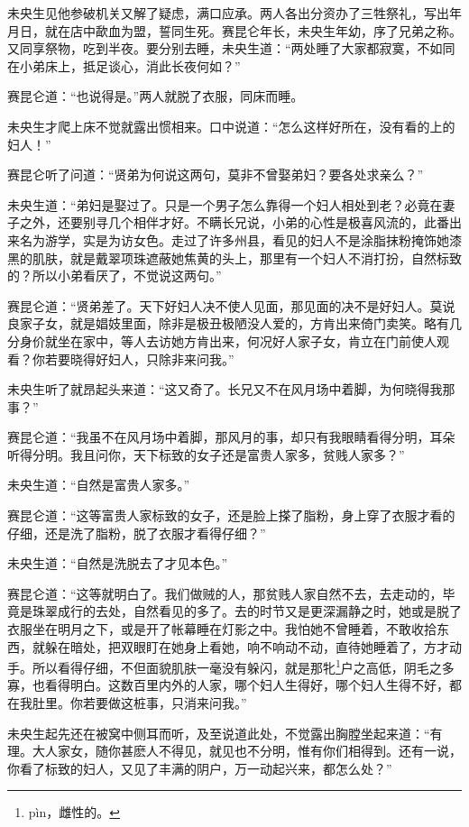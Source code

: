 \documentclass[a4paper,12pt,UTF8,twoside]{ctexbook}
\begin{document}
未央生见他参破机关又解了疑虑，满口应承。两人各出分资办了三牲祭礼，写出年月日，就在店中歃血为盟，誓同生死。赛昆仑年长，未央生年幼，序了兄弟之称。又同享祭物，吃到半夜。要分别去睡，未央生道：“两处睡了大家都寂寞，不如同在小弟床上，抵足谈心，消此长夜何如？”

赛昆仑道：“也说得是。”两人就脱了衣服，同床而睡。

未央生才爬上床不觉就露出惯相来。口中说道：“怎么这样好所在，没有看的上的妇人！”

赛昆仑听了问道：“贤弟为何说这两句，莫非不曾娶弟妇？要各处求亲么？”

未央生道：“弟妇是娶过了。只是一个男子怎么靠得一个妇人相处到老？必竟在妻子之外，还要别寻几个相伴才好。不瞒长兄说，小弟的心性是极喜风流的，此番出来名为游学，实是为访女色。走过了许多州县，看见的妇人不是涂脂抹粉掩饰她漆黑的肌肤，就是戴翠项珠遮蔽她焦黄的头上，那里有一个妇人不消打扮，自然标致的？所以小弟看厌了，不觉说这两句。”

赛昆仑道：“贤弟差了。天下好妇人决不使人见面，那见面的决不是好妇人。莫说良家子女，就是娼妓里面，除非是极丑极陋没人爱的，方肯出来倚门卖笑。略有几分身价就坐在家中，等人去访她方肯出来，何况好人家子女，肯立在门前使人观看？你若要晓得好妇人，只除非来问我。”

未央生听了就昂起头来道：“这又奇了。长兄又不在风月场中着脚，为何晓得我那事？”

赛昆仑道：“我虽不在风月场中着脚，那风月的事，却只有我眼睛看得分明，耳朵听得分明。我且问你，天下标致的女子还是富贵人家多，贫贱人家多？”

未央生道：“自然是富贵人家多。”

赛昆仑道：“这等富贵人家标致的女子，还是脸上搽了脂粉，身上穿了衣服才看的仔细，还是洗了脂粉，脱了衣服才看得仔细？”

未央生道：“自然是洗脱去了才见本色。”

赛昆仑道：“这等就明白了。我们做贼的人，那贫贱人家自然不去，去走动的，毕竟是珠翠成行的去处，自然看见的多了。去的时节又是更深漏静之时，她或是脱了衣服坐在明月之下，或是开了帐幕睡在灯影之中。我怕她不曾睡着，不敢收拾东西，就躲在暗处，把双眼盯在她身上看她，响不响动不动，直待她睡着了，方才动手。所以看得仔细，不但面貌肌肤一毫没有躲闪，就是那牝\footnote{p\`in，雌性的。}户之高低，阴毛之多寡，也看得明白。这数百里内外的人家，哪个妇人生得好，哪个妇人生得不好，都在我肚里。你若要做这桩事，只消来问我。”

未央生起先还在被窝中侧耳而听，及至说道此处，不觉露出胸膛坐起来道：“有理。大人家女，随你甚麽人不得见，就见也不分明，惟有你们相得到。还有一说，你看了标致的妇人，又见了丰满的阴户，万一动起兴来，都怎么处？”
\end{document}
